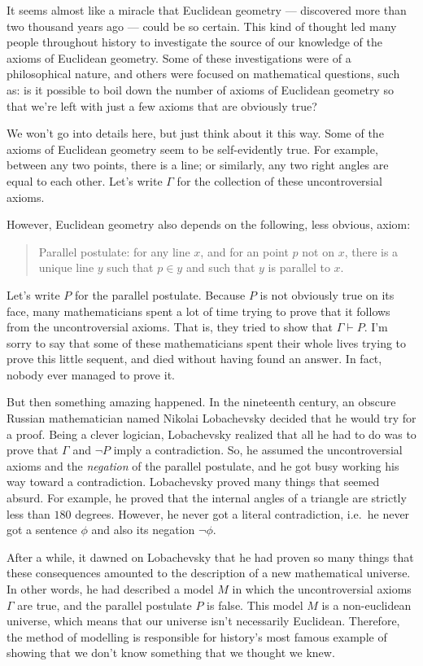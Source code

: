 It seems almost like a miracle that Euclidean geometry --- discovered
more than two thousand years ago --- could be so certain.  This kind
of thought led many people throughout history to investigate the
source of our knowledge of the axioms of Euclidean geometry.  Some of
these investigations were of a philosophical nature, and others were
focused on mathematical questions, such as: is it possible to boil
down the number of axioms of Euclidean geometry so that we're left
with just a few axioms that are obviously true?

We won't go into details here, but just think about it this way.  Some
of the axioms of Euclidean geometry seem to be self-evidently true.
For example, between any two points, there is a line; or similarly,
any two right angles are equal to each other.  Let's write $\Gamma$
for the collection of these uncontroversial axioms.

However, Euclidean geometry also depends on the following, less
obvious, axiom:
\begin{quote}
  Parallel postulate: for any line $x$, and for an point $p$ not on
  $x$, there is a unique line $y$ such that $p\in y$ and such that $y$
  is parallel to $x$. \end{quote} Let's write $P$ for the parallel
postulate.  Because $P$ is not obviously true on its face, many
mathematicians spent a lot of time trying to prove that it follows
from the uncontroversial axioms.  That is, they tried to show that
$\Gamma\vdash P$.  I'm sorry to say that some of these mathematicians
spent their whole lives trying to prove this little sequent, and died
without having found an answer.  In fact, nobody ever managed to prove
it.

\label{loba}

But then something amazing happened.  In the nineteenth century, an
obscure Russian mathematician named Nikolai Lobachevsky decided that
he would try for a proof.  Being a clever logician, Lobachevsky
realized that all he had to do was to prove that $\Gamma$ and $\neg P$
imply a contradiction.  So, he assumed the uncontroversial axioms and
the {\it negation} of the parallel postulate, and he got busy working
his way toward a contradiction.  Lobachevsky proved many things that
seemed absurd.  For example, he proved that the internal angles of a
triangle are strictly less than $180$ degrees.  However, he never got
a literal contradiction, i.e.\ he never got a sentence $\phi$ and also
its negation $\neg \phi$.

After a while, it dawned on Lobachevsky that he had proven so many
things that these consequences amounted to the description of a new
mathematical universe.  In other words, he had described a model $M$
in which the uncontroversial axioms $\Gamma$ are true, and the
parallel postulate $P$ is false.  This model $M$ is a non-euclidean
universe, which means that our universe isn't necessarily Euclidean.
Therefore, the method of modelling is responsible for history's most
famous example of showing that we don't know something that we thought
we knew.

